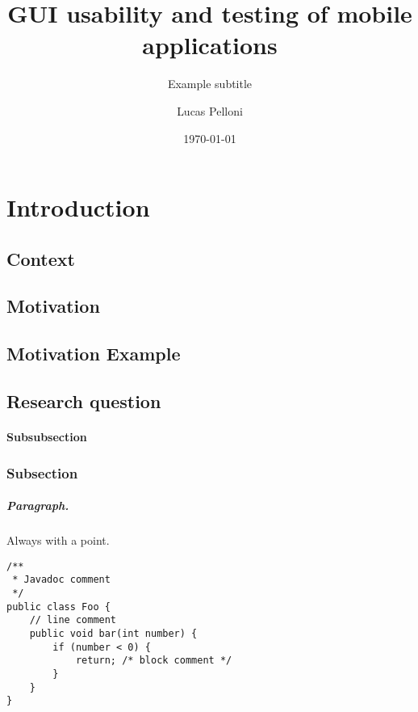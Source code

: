 \documentclass{seal_thesis}
\date{\today}
\title{GUI usability and testing of mobile applications}
\subtitle{Example subtitle}
\author{Lucas Pelloni}
\begin{document}
\maketitle

\frontmatter

\begin{acknowledgements}
\end{acknowledgements}

\begin{abstract}
\end{abstract}

\begin{zusammenfassung}
\end{zusammenfassung}

\tableofcontents
\listoffigures
\listoftables
\lstlistoflistings

\mainmatter
\chapter{Introduction}
\section{Context}
\section{Motivation}
\section{Motivation Example}
\section{Research question}
%
\subsubsection{Subsubsection}

\subsection{Subsection}
%
\paragraph{Paragraph.} Always with a point.

\begin{lstlisting}[caption=An example code snippet]
/**
 * Javadoc comment
 */
public class Foo {
	// line comment
	public void bar(int number) {
		if (number < 0) {
			return; /* block comment */
		}
	}
}
\end{lstlisting}
\end{document}
